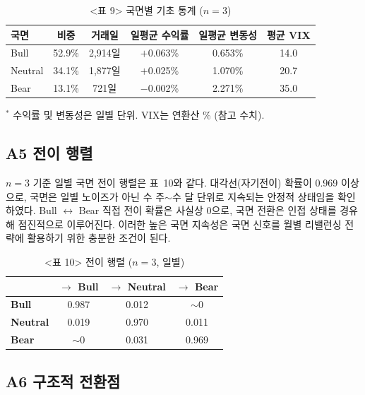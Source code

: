\documentclass{article}
\begin{document}
\begin{table}[ht]
\centering
\caption{<표 9> 국면별 기초 통계 ($n=3$)}
\label{tab:a1_stats}
\begin{tabular}{lccccc}
\toprule
\textbf{국면} & \textbf{비중} & \textbf{거래일} & \textbf{일평균 수익률} & \textbf{일평균 변동성} & \textbf{평균 VIX} \\
\midrule
Bull    & 52.9\% & 2,914일 & $+$0.063\% & 0.653\% & 14.0 \\
Neutral & 34.1\% & 1,877일 & $+$0.025\% & 1.070\% & 20.7 \\
Bear    & 13.1\% &   721일 & $-$0.002\% & 2.271\% & 35.0 \\
\bottomrule
\end{tabular}
\begin{flushleft}
{\small $^*$ 수익률 및 변동성은 일별 단위. VIX는 연환산 \% (참고 수치).}
\end{flushleft}
\end{table}

\subsection*{A5 전이 행렬}

$n = 3$ 기준 일별 국면 전이 행렬은 표~10와 같다. 대각선(자기전이) 확률이 0.969 이상으로, 국면은 일별 노이즈가 아닌 수 주$\sim$수 달 단위로 지속되는 안정적 상태임을 확인하였다. Bull $\leftrightarrow$ Bear 직접 전이 확률은 사실상 0으로, 국면 전환은 인접 상태를 경유해 점진적으로 이루어진다. 이러한 높은 국면 지속성은 국면 신호를 월별 리밸런싱 전략에 활용하기 위한 충분한 조건이 된다.

\begin{table}[ht]
\centering
\caption{<표 10> 전이 행렬 ($n=3$, 일별)}
\label{tab:a1_trans}
\begin{tabular}{lccc}
\toprule
 & \textbf{$\rightarrow$ Bull} & \textbf{$\rightarrow$ Neutral} & \textbf{$\rightarrow$ Bear} \\
\midrule
\textbf{Bull}    & 0.987 & 0.012 & $\sim$0 \\
\textbf{Neutral} & 0.019 & 0.970 & 0.011 \\
\textbf{Bear}    & $\sim$0 & 0.031 & 0.969 \\
\bottomrule
\end{tabular}
\end{table}

\subsection*{A6 구조적 전환점}
\end{document}
